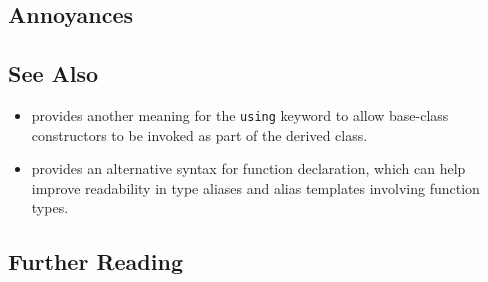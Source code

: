 \hspace*{\fill}

\subsection[Annoyances]{Annoyances}\label{annoyances}

\hspace*{\fill}

\subsection[See Also]{See Also}\label{see-also}

\begin{itemize}
\item{provides another meaning for the \lstinline!using! keyword to allow base-class constructors to be invoked as part of the derived class.}
\item{provides an alternative syntax for function declaration, which can help improve readability in type aliases and alias templates involving function types.}
\end{itemize}

\subsection[Further Reading]{Further Reading}\label{further-reading}





